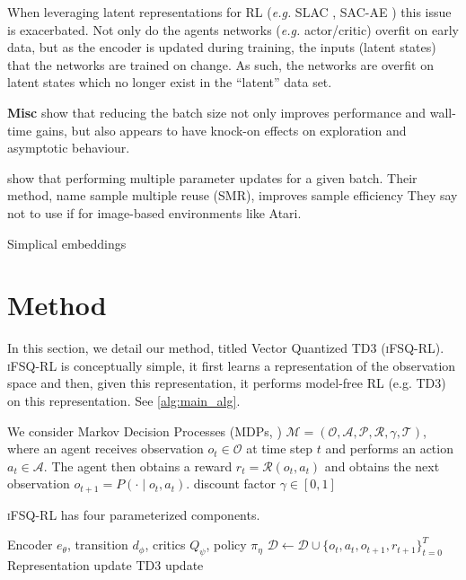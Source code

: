\documentclass{article}
\makeatletter
\theoremstyle{plain}
\theoremstyle{definition}
\theoremstyle{remark}
\newcommand{\our}{\textsc{iFSQ-RL}\xspace}
\newcommand{\eg}{\textit{e.g.\@}\xspace}
\makeatother
\begin{document}
When leveraging latent representations for RL (\eg SLAC \citep{leeStochasticLatentActorCritic2020},
SAC-AE \citep{yaratsImprovingSampleEfficiency2021}) this issue is exacerbated.
Not only do the agents networks (\eg actor/critic) overfit on early data, but as the encoder is updated during training, the
inputs (latent states) that the networks are trained on change.
As such, the networks are overfit on latent states which no longer exist in the ``latent'' data set.



\textbf{Misc}
\citet{obando-ceronSmallBatchDeep2023a} show that reducing the batch size not only improves
performance and wall-time gains, but also appears to have knock-on effects on exploration and asymptotic behaviour.

\citet{lyuOffPolicyRLAlgorithms2023} show that performing multiple parameter updates for a given batch.
Their method, name sample multiple reuse (SMR), improves sample efficiency
They say not to use if for image-based environments like Atari.


Simplical embeddings
\cite{lavoieSimplicialEmbeddingsSelfSupervised2022}


\section{Method}
\label{sec:method}

In this section, we detail our method, titled Vector Quantized TD3 (\our).
\our is conceptually simple, it first learns a representation of the observation space and then,
given this representation, it performs model-free RL (e.g. TD3) on this representation.
See \cref{alg:main_alg}.

We consider Markov Decision Processes (MDPs, \citet{bellmanMarkovianDecisionProcess1957a}) $\mathcal{M} = (\mathcal{O}, \mathcal{A}, \mathcal{P}, \mathcal{R}, \gamma,\mathcal{T})$, where an agent receives
observation $o_{t} \in \mathcal{O}$ at time step $t$ and performs an action $a_{t} \in \mathcal{A}$.
The agent then obtains a reward $r_{t} = \mathcal{R} (o_{t}, a_{t})$ and obtains the next observation
$o_{t+1} = P(\cdot \mid o_{t}, a_{t})$.
discount factor $\gamma \in [0, 1]$


\our has four parameterized components.
\begin{algorithm}[tb]
   \caption{\our}
   \label{alg:main_alg}
\begin{algorithmic}
    Encoder $e_{\theta}$, transition $d_{\phi}$, critics $Q_{\psi}$, policy $\pi_{\eta}$
    \STATE $\mathcal{D} \leftarrow \mathcal{D} \cup \{o_{t}, a_{t}, o_{t+1}, r_{t+1}\}^{T}_{t=0}$
        \STATE Representation update
        \STATE TD3 update
    \ENDFOR
   \ENDFOR
\end{algorithmic}
\end{algorithm}
\end{document}
